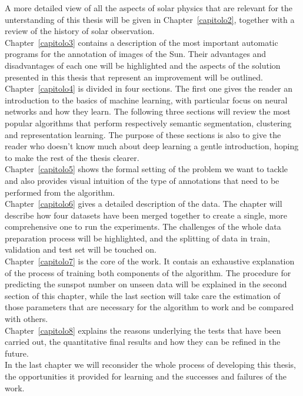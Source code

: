 A more detailed view of all the aspects of solar physics that are relevant for the unterstanding of this thesis will be given in Chapter~\autoref{capitolo2}, together with a review of the history of solar observation.\\
Chapter~\autoref{capitolo3} contains a description of the most important automatic programs for the annotation of images of the Sun. Their advantages and disadvantages of each one will be highlighted and the aspects of the solution presented in this thesis that represent an improvement will be outlined.\\
Chapter~\autoref{capitolo4} is divided in four sections. The first one gives the reader an introduction to the basics of machine learning, with particular focus on neural networks and how they learn. The following three sections will review the most popular algorithms that perform respectively semantic segmentation, clustering and representation learning. The purpose of these sections is also to give the reader who doesn't know much about deep learning a gentle introduction, hoping to make the rest of the thesis clearer.\\
Chapter~\autoref{capitolo5} shows the formal setting of the problem we want to tackle and also provides visual intuition of the type of annotations that need to be performed from the algorithm.\\
Chapter~\autoref{capitolo6} gives a detailed description of the data. The chapter will describe how four datasets have been merged together to create a single, more comprehensive one to run the experiments. The challenges of the whole data preparation process will be highlighted, and the splitting of data in train, validation and test set will be touched on.\\
Chapter~\autoref{capitolo7} is the core of the work. It contais an exhaustive explanation of the process of training both components of the algorithm. The procedure for predicting the sunspot number on unseen data will be explained in the second section of this chapter, while the last section will take care the estimation of those parameters that are necessary for the algorithm to work and be compared with others.\\
Chapter~\autoref{capitolo8} explains the reasons underlying the tests that have been carried out, the quantitative final results and how they can be refined in the future.\\
In the last chapter we will reconsider the whole process of developing this thesis, the opportunities it provided for learning and the successes and failures of the work.\\
